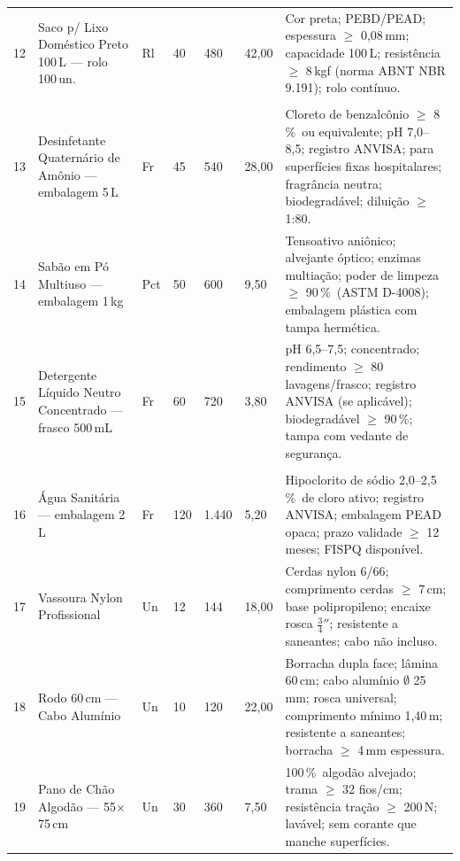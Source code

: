 \documentclass[12pt,a4paper]{article}
\newcommand{\pct}{\%}
\begin{document}
\begin{landscape}
\begin{longtable}{C{0.5cm} L{4.2cm} C{1.0cm} C{1.5cm} C{1.8cm} C{2.2cm} L{5.5cm}}
12 & Saco p/ Lixo Doméstico Preto 100\,L --- rolo 100\,un. &
Rl & 40 & 480 & 42,00 &
Cor preta; PEBD/PEAD; espessura $\geq$ 0,08\,mm; capacidade 100\,L; resistência $\geq$ 8\,kgf (norma ABNT NBR 9.191); rolo contínuo. \\

 \\
13 & Desinfetante Quaternário de Amônio --- embalagem 5\,L &
Fr & 45 & 540 & 28,00 &
Cloreto de benzalcônio $\geq$ 8\,\pct\ ou equivalente; pH 7,0--8,5; registro ANVISA; para superfícies fixas hospitalares; fragrância neutra; biodegradável; diluição $\geq$ 1:80. \\

14 & Sabão em Pó Multiuso --- embalagem 1\,kg &
Pct & 50 & 600 & 9,50 &
Tensoativo aniônico; alvejante óptico; enzimas multiação; poder de limpeza $\geq$ 90\,\pct\ (ASTM D-4008); embalagem plástica com tampa hermética. \\

15 & Detergente Líquido Neutro Concentrado --- frasco 500\,mL &
Fr & 60 & 720 & 3,80 &
pH 6,5--7,5; concentrado; rendimento $\geq$ 80 lavagens/frasco; registro ANVISA (se aplicável); biodegradável $\geq$ 90\,\pct; tampa com vedante de segurança. \\

 \\
16 & Água Sanitária --- embalagem 2\,L &
Fr & 120 & 1.440 & 5,20 &
Hipoclorito de sódio 2,0--2,5\,\pct\ de cloro ativo; registro ANVISA; embalagem PEAD opaca; prazo validade $\geq$ 12\,meses; FISPQ disponível. \\

17 & Vassoura Nylon Profissional &
Un & 12 & 144 & 18,00 &
Cerdas nylon 6/66; comprimento cerdas $\geq$ 7\,cm; base polipropileno; encaixe rosca $\frac{3}{4}''$; resistente a saneantes; cabo não incluso. \\

18 & Rodo 60\,cm --- Cabo Alumínio &
Un & 10 & 120 & 22,00 &
Borracha dupla face; lâmina 60\,cm; cabo alumínio $\emptyset$ 25\,mm; rosca universal; comprimento mínimo 1,40\,m; resistente a saneantes; borracha $\geq$ 4\,mm espessura. \\

19 & Pano de Chão Algodão --- 55$\times$75\,cm &
Un & 30 & 360 & 7,50 &
100\,\pct\ algodão alvejado; trama $\geq$ 32 fios/cm; resistência tração $\geq$ 200\,N; lavável; sem corante que manche superfícies. \\


\end{longtable}
\end{landscape}
\end{document}
